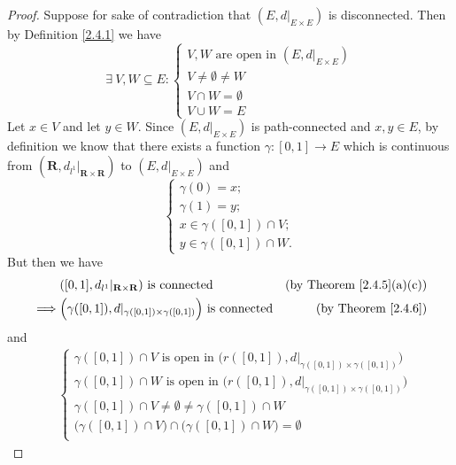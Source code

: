 \begin{proof}
    Suppose for sake of contradiction that \((E, d|_{E \times E})\) is disconnected.
    Then by Definition \ref{2.4.1} we have
    \[
        \exists\ V, W \subseteq E : \begin{cases}
            V, W \text{ are open in } (E, d|_{E \times E}) \\
            V \neq \emptyset \neq W                        \\
            V \cap W = \emptyset                           \\
            V \cup W = E
        \end{cases}
    \]
    Let \(x \in V\) and let \(y \in W\).
    Since \((E, d|_{E \times E})\) is path-connected and \(x, y \in E\), by definition we know that there exists a function \(\gamma : [0, 1] \to E\) which is continuous from \((\mathbf{R}, d_{l^1}|_{\mathbf{R} \times \mathbf{R}})\) to \((E, d|_{E \times E})\) and
    \[
        \begin{cases}
            \gamma(0) = x;               \\
            \gamma(1) = y;               \\
            x \in \gamma([0, 1]) \cap V; \\
            y \in \gamma([0, 1]) \cap W.
        \end{cases}
    \]
    But then we have
    \begin{align*}
                 & ([0, 1], d_{l^1}|_{\mathbf{R} \times \mathbf{R}}) \text{ is connected}                   & \text{(by Theorem \ref{2.4.5}(a)(c))} \\
        \implies & \Big(\gamma([0, 1]), d|_{\gamma([0, 1]) \times \gamma([0, 1])}\Big) \text{ is connected} & \text{(by Theorem \ref{2.4.6})}
    \end{align*}
    and
    \begin{align*}
                 & \begin{cases}
                       \gamma([0, 1]) \cap V \text{ is open in } \big(r([0, 1]), d|_{\gamma([0, 1]) \times \gamma([0, 1])}\big) \\
                       \gamma([0, 1]) \cap W \text{ is open in } \big(r([0, 1]), d|_{\gamma([0, 1]) \times \gamma([0, 1])}\big) \\
                       \gamma([0, 1]) \cap V \neq \emptyset \neq \gamma([0, 1]) \cap W                                          \\
                       \big(\gamma([0, 1]) \cap V\big) \cap \big(\gamma([0, 1]) \cap W\big) = \emptyset                         \\

\end{cases}
\end{align*}
\end{proof}
